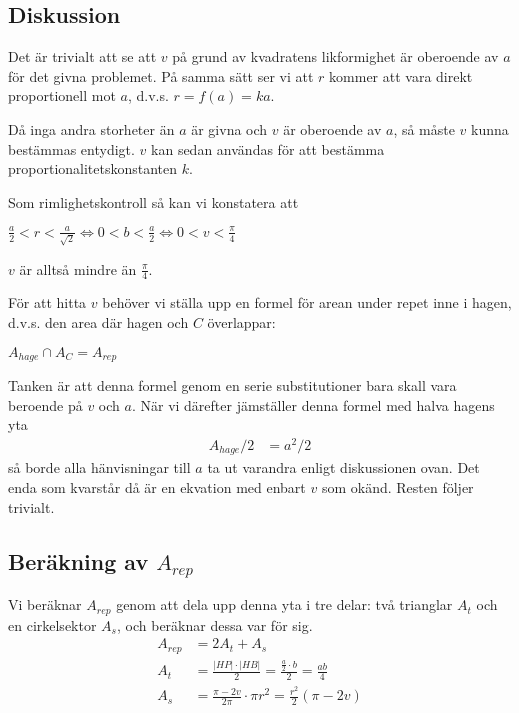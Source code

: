 \documentclass[10pt]{article}
\begin{document}
  \subsection*{Diskussion}

  Det är trivialt att se att $v$ på grund av kvadratens likformighet är oberoende av $a$ för det givna problemet. På samma sätt ser vi att $r$ kommer att vara direkt proportionell mot $a$, d.v.s. $r = f(a) = ka$.

  Då inga andra storheter än $a$ är givna och $v$ är oberoende av $a$, så måste $v$ kunna bestämmas entydigt. $v$ kan sedan användas för att bestämma proportionalitetskonstanten $k$.

  Som rimlighetskontroll så kan vi konstatera att\\
  \centerline{$\frac{a}{2} < r < \frac{a}{\sqrt{2}} \Longleftrightarrow 0 < b < \frac{a}{2} \Longleftrightarrow 0 < v < \frac{\pi}{4}$}

  $v$ är alltså mindre än $\frac{\pi}{4}$.

  För att hitta $v$ behöver vi ställa upp en formel för arean under repet inne i hagen, d.v.s. den area där hagen och $C$ överlappar:\\
  \centerline{$A_{hage} \cap A_C = A_{rep}$}
  Tanken är att denna formel genom en serie substitutioner bara skall vara beroende på $v$ och $a$. När vi därefter jämställer denna formel med halva hagens yta
  \begin{align}
    A_{hage}/2 &= a^2/2 \label{halvahagen}
  \end{align}
  så borde alla hänvisningar till $a$ ta ut varandra enligt diskussionen ovan. Det enda som kvarstår då är en ekvation med enbart $v$ som okänd. Resten följer trivialt.

  \subsection*{Beräkning av $A_{rep}$}

  Vi beräknar $A_{rep}$ genom att dela upp denna yta i tre delar: två trianglar $A_{t}$ och en cirkelsektor $A_{s}$, och beräknar dessa var för sig.
  \begin{align}
    A_{rep} &= 2A_t + A_s \\
    A_t &= \frac{|HP| \cdot |HB|}{2} = \frac{\frac{a}{2} \cdot b}{2} = \frac{ab}{4} \\
    A_s &= \frac{\pi-2v}{2\pi} \cdot \pi r^2 = \frac{r^2}{2}(\pi-2v)
  \end{align}
\end{document}
